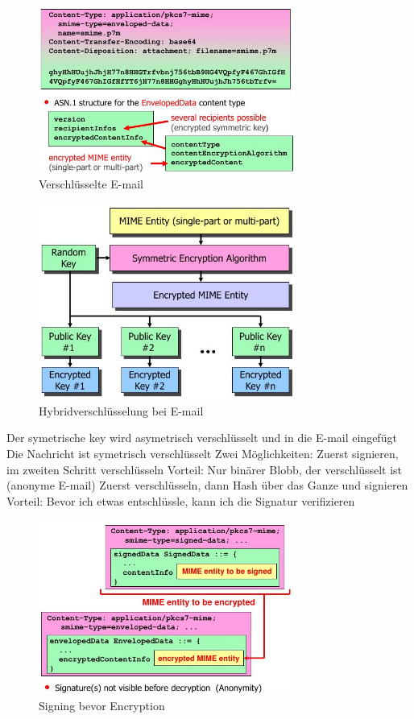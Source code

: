 \documentclass[ngerman,a4paper,12pt]{scrreprt}
\begin{document}
\begin{figure}[H]
	\centering
	\includegraphics[width=0.75\textwidth]{img/V8.3.jpg}
	\caption{Verschlüsselte E-mail}
	\label{}
\end{figure}

\begin{figure}[H]
	\centering
	\includegraphics[width=0.75\textwidth]{img/V8.4.jpg}
	\caption{Hybridverschlüsselung bei E-mail}
	\label{}
\end{figure}
\ul
	\li Der symetrische key wird asymetrisch verschlüsselt und in die E-mail eingefügt
	\li Die Nachricht ist symetrisch verschlüsselt
	\li Zwei Möglichkeiten:
		\ul
			\li Zuerst signieren, im zweiten Schritt verschlüsseln
				\ul
					\li Vorteil: Nur binärer Blobb, der verschlüsselt ist (anonyme E-mail)
				\ulE
			\li Zuerst verschlüsseln, dann Hash über das Ganze und signieren
				\ul
					\li Vorteil: Bevor ich etwas entschlüssle, kann ich die Signatur verifizieren
				\ulE
		\ulE
\ulE

\begin{figure}[H]
	\centering
	\includegraphics[width=0.75\textwidth]{img/V8.5.jpg}
	\caption{Signing bevor Encryption}
	\label{}
\end{figure}
\end{document}
